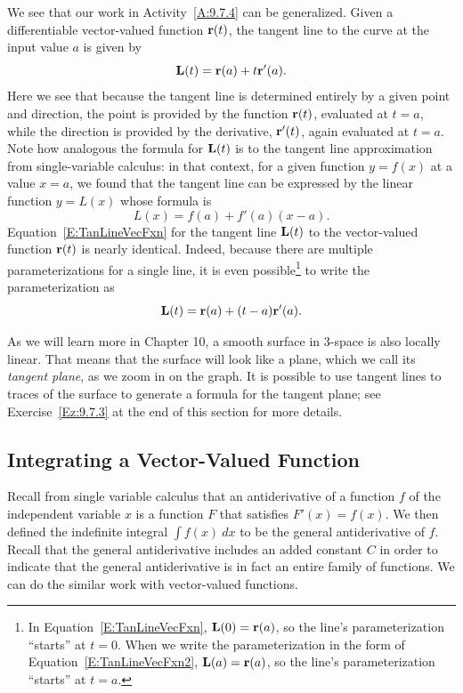 \newpage



We see that our work in Activity~\ref{A:9.7.4} can be generalized.
Given a differentiable vector-valued function $\mathbf{r}(t)$, the tangent
line to the curve at the input value $a$ is given by
\begin{equation} \label{E:TanLineVecFxn} \mathbf{L}(t) = \mathbf{r}(a) + t \mathbf{r}'(a).
\end{equation} Here we see that because the tangent line is determined
entirely by a given point and direction, the point is provided by the
function $\mathbf{r}(t)$, evaluated at $t = a$, while the direction is
provided by the derivative, $\mathbf{r}'(t)$, again evaluated at $t = a$.
Note how analogous the formula for $\mathbf{L}(t)$ is to the tangent line
approximation from single-variable calculus: in that context, for a
given function $y = f(x)$ at a value $x = a$, we found that the
tangent line can be expressed by the linear function $y = L(x)$ whose
formula is
$$L(x) = f(a) + f'(a)(x-a).$$
Equation~\eqref{E:TanLineVecFxn} for the tangent line $\mathbf{L}(t)$ to the
vector-valued function $\mathbf{r}(t)$ is nearly identical.  Indeed, because
there are multiple parameterizations for a single line, it is even
possible\footnote{In Equation~\eqref{E:TanLineVecFxn}, $\mathbf{L}(0) =
\mathbf{r}(a)$, so the line's parameterization ``starts'' at $t = 0$.  When
we write the parameterization in the form of
Equation~\eqref{E:TanLineVecFxn2}, $\mathbf{L}(a) = \mathbf{r}(a)$, so the line's
parameterization ``starts'' at $t = a$.} to write the parameterization
as
\begin{equation} \label{E:TanLineVecFxn2} \mathbf{L}(t) = \mathbf{r}(a) + (t-a)
\mathbf{r}'(a).
\end{equation}

As we will learn more in Chapter 10, a smooth surface in 3-space is
also locally linear. That means that the surface will look like a
plane, which we call its {\em tangent plane}, as we zoom in on the
graph.  It is possible to use tangent lines to traces of the surface
to generate a formula for the tangent plane; see
Exercise~\ref{Ez:9.7.3} at the end of this section for more details.

%



\subsection*{Integrating a Vector-Valued Function}

Recall from single variable calculus that an antiderivative of a
function $f$ of the independent variable $x$ is a function $F$ that
satisfies $F'(x) = f(x)$. We then defined the indefinite integral
$\int f(x) \ dx$ to be the general antiderivative of $f$.  Recall that
the general antiderivative includes an added constant $C$ in order to
indicate that the general antiderivative is in fact an entire family
of functions. We can do the similar work with vector-valued functions.

